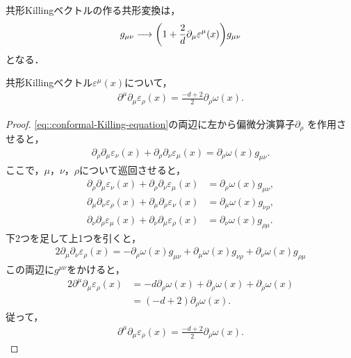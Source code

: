 共形Killingベクトルの作る共形変換は，
\begin{align}
	g_{\mu\nu}\longrightarrow\mleft(1+\frac{2}{d}\partial_{\mu}\varepsilon^{\mu}(x)\mright)g_{\mu\nu}
\end{align}
となる．
\begin{prop}\label{prop::conformal-Killing-vector-and-omega}
	共形Killingベクトル\(\varepsilon^{\mu}(x)\)について，
	\begin{align}
		\partial^{\mu}\partial_{\mu}\varepsilon_{\rho}(x)=\frac{-d+2}{2}\partial_{\rho}\omega(x).
	\end{align}
\end{prop}
\begin{proof}
	\cref{eq::conformal-Killing-equation}の両辺に左から偏微分演算子\(\partial_{\rho}\)
	を作用させると，
	\begin{align}
		\partial_{\rho}\partial_{\mu}\varepsilon_{\nu}(x)+\partial_{\rho}\partial_{\nu}\varepsilon_{\mu}(x)=\partial_{\rho}\omega(x)g_{\mu\nu}.
	\end{align}
	ここで，\(\mu\)，\(\nu\)，\(\rho\)について巡回させると，
	\begin{align}
		\partial_{\rho}\partial_{\mu}\varepsilon_{\nu}(x)+\partial_{\rho}\partial_{\nu}\varepsilon_{\mu}(x) & =\partial_{\rho}\omega(x)g_{\mu\nu}, \\
		\partial_{\mu}\partial_{\nu}\varepsilon_{\rho}(x)+\partial_{\mu}\partial_{\rho}\varepsilon_{\nu}(x) & =\partial_{\mu}\omega(x)g_{\nu\rho}, \\
		\partial_{\nu}\partial_{\rho}\varepsilon_{\mu}(x)+\partial_{\nu}\partial_{\mu}\varepsilon_{\rho}(x) & =\partial_{\nu}\omega(x)g_{\rho\mu}.
	\end{align}
	下2つを足して上1つを引くと，
	\begin{align}\label{eq::conformal-formula-1}
		2\partial_{\mu}\partial_{\nu}\varepsilon_{\rho}(x)=-\partial_{\rho}\omega(x)g_{\mu\nu}+\partial_{\mu}\omega(x)g_{\nu\rho}+\partial_{\nu}\omega(x)g_{\rho\mu}
	\end{align}
	この両辺に\(g^{\mu\nu}\)をかけると，
	\begin{align}
		2\partial^{\mu}\partial_{\mu}\varepsilon_{\rho}(x) & =-d\partial_{\rho}\omega(x)+\partial_{\rho}\omega(x)+\partial_{\rho}\omega(x) \\
		                                                   & =(-d+2)\partial_{\rho}\omega(x).
	\end{align}
	従って，
	\begin{align}
		\partial^{\mu}\partial_{\mu}\varepsilon_{\rho}(x)=\frac{-d+2}{2}\partial_{\rho}\omega(x).
	\end{align}
\end{proof}
